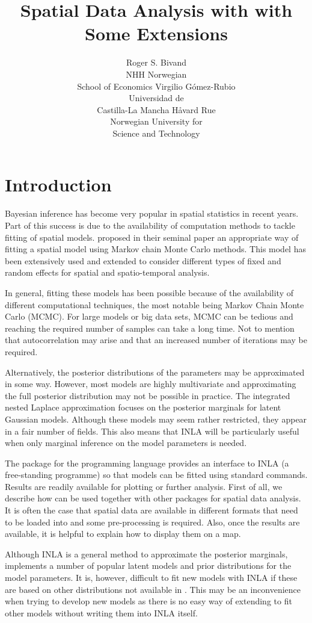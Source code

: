 \documentclass[article]{jss}
\author{Roger S. Bivand\\NHH Norwegian\\ School of Economics \And 
Virgilio G\'omez-Rubio\\Universidad de\\ Castilla-La Mancha 
\And H\r{a}vard Rue\\Norwegian University for\\ Science and Technology
}
\title{Spatial Data Analysis with \pkg{R-INLA} with Some Extensions}
\begin{document}
\section[Introduction]{Introduction}


Bayesian inference has become very popular in spatial statistics in recent
years. Part of this success is due to the availability of computation methods
to tackle fitting of spatial models. \citet{besagetal:1991} proposed in their
seminal paper an appropriate way of fitting a spatial model using Markov chain
Monte Carlo methods. This model has been extensively used and extended to
consider different types of fixed and random effects for spatial and
spatio-temporal analysis.

In general, fitting these models has been possible because of the availability
of different computational techniques, the most notable being Markov Chain
Monte Carlo (MCMC). For large models or big data sets, MCMC can be tedious and
reaching the required number of samples can take a long time. Not to mention
that autocorrelation may arise and that an increased number of iterations may
be required.

Alternatively, the posterior distributions of the parameters may be
approximated in some way. However, most models are highly multivariate and
approximating the full posterior distribution may not be possible in practice.
The integrated nested Laplace approximation \citep[][INLA]{isi:000264374200002}
focuses on the posterior marginals for latent Gaussian models. Although these
models may seem rather restricted, they appear in a fair number of fields.
This also means that INLA will be particularly useful when only marginal
inference on the model parameters is needed.

The  package \citep{rinla:2013} for the  programming
language provides an interface to INLA (a free-standing programme) so that models can be fitted using
standard  commands. Results are readily available for plotting or
further analysis. First of all, we describe how  can be used
together with other  packages for spatial data analysis. It is often
the case that spatial data are available in different formats
that need to be loaded into  and some pre-processing is
required. Also, once the results are available, it is helpful to explain 
how to display them on a map.

Although INLA is a general method to approximate the
posterior marginals,  implements a number of popular latent models and prior
distributions for the model parameters.
It is, however, difficult to fit new models with INLA if these
are based on other distributions not available in .  This may be an
inconvenience when trying to develop new models as there is no easy way of
extending  to fit other models without writing them into INLA itself.
\end{document}
